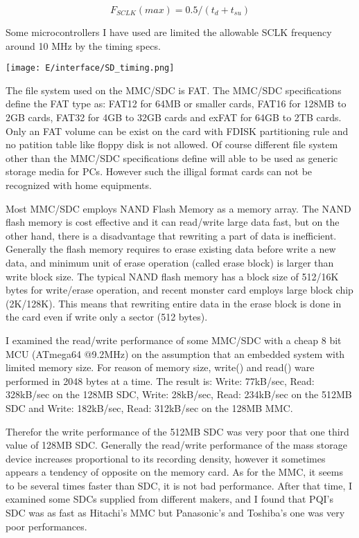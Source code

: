\begin{equation}
F_{SCLK}(max) = 0.5 / (t_{d} + t_{su})
\end{equation}

Some microcontrollers I have used are limited the allowable SCLK frequency
around 10 MHz by the timing specs.

\bigskip
\noindent\texttt{[image: E/interface/SD\_timing.png]}
\bigskip


The file system used on the MMC/SDC is FAT. The MMC/SDC specifications define
the FAT type as: FAT12 for 64MB or smaller cards, FAT16 for 128MB to 2GB cards,
FAT32 for 4GB to 32GB cards and exFAT for 64GB to 2TB cards. Only an FAT volume
can be exist on the card with FDISK partitioning rule and no patition table like
floppy disk is not allowed. Of course different file system other than the
MMC/SDC specifications define will able to be used as generic storage media for
PCs. However such the illigal format cards can not be recognized with home
equipments.

\secdown

Most MMC/SDC employs NAND Flash Memory as a memory array. The NAND flash memory
is cost effective and it can read/write large data fast, but on the other hand,
there is a disadvantage that rewriting a part of data is inefficient. Generally
the flash memory requires to erase existing data before write a new data, and
minimum unit of erase operation (called erase block) is larger than write block
size. The typical NAND flash memory has a block size of 512/16K bytes for
write/erase operation, and recent monster card employs large block chip
(2K/128K). This means that rewriting entire data in the erase block is done in
the card even if write only a sector (512 bytes).


I examined the read/write performance of some MMC/SDC with a cheap 8 bit MCU
(ATmega64 @9.2MHz) on the assumption that an embedded system with limited memory
size. For reason of memory size, write() and read() ware performed in 2048 bytes
at a time. The result is: Write: 77kB/sec, Read: 328kB/sec on the 128MB SDC,
Write: 28kB/sec, Read: 234kB/sec on the 512MB SDC and Write: 182kB/sec, Read:
312kB/sec on the 128MB MMC.

Therefor the write performance of the 512MB SDC was very poor that one third
value of 128MB SDC. Generally the read/write performance of the mass storage
device increases proportional to its recording density, however it sometimes
appears a tendency of opposite on the memory card. As for the MMC, it seems to
be several times faster than SDC, it is not bad performance. After that time, I
examined some SDCs supplied from different makers, and I found that PQI's SDC
was as fast as Hitachi's MMC but Panasonic's and Toshiba's one was very poor
performances.


